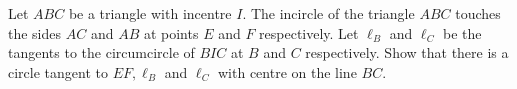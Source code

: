 Let $ABC$ be a triangle with incentre $I$. The incircle of the triangle $ABC$ touches the sides $AC$ and $AB$ at points $E$ and $F$ respectively. Let $\ell_B$ and $\ell_C$ be the tangents to the circumcircle of $BIC$ at $B$ and $C$ respectively. Show that there is a circle tangent to $EF, \ell_B$ and $\ell_C$ with centre on the line $BC$.
